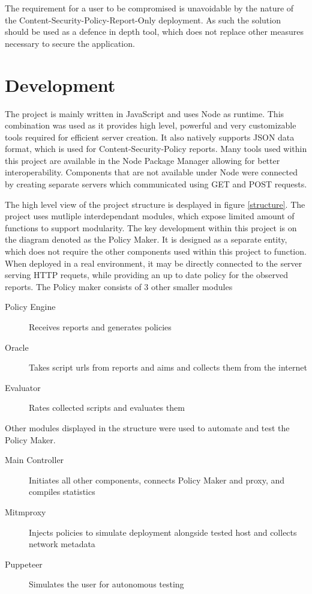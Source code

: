 The requirement for a user to be compromised is unavoidable by the nature of the Content-Security-Policy-Report-Only deployment.
As such the solution should be used as a defence in depth tool, which does not replace other measures necessary to secure the application.

\section{Development}

The project is mainly written in JavaScript and uses Node as runtime.
This combination was used as it provides high level, powerful and very customizable tools required for efficient server creation.
It also natively supports JSON data format, which is used for Content-Security-Policy reports.
Many tools used within this project are available in the Node Package Manager allowing for better interoperability.
Components that are not available under Node were connected by creating separate servers which communicated using GET and POST requests.

The high level view of the project structure is desplayed in figure \ref{structure}.
The project uses mutliple interdependant modules, which expose limited amount of functions to support modularity.
The key development within this project is on the diagram denoted as the Policy Maker.
It is designed as a separate entity, which does not require the other components used within this project to function.
When deployed in a real environment, it may be directly connected to the server serving HTTP requets, while providing an up to date policy for the observed reports.
The Policy maker consists of 3 other smaller modules 
\begin{description}
	\item[Policy Engine] Receives reports and generates policies
	\item[Oracle] Takes script urls from reports and aims and collects them from the internet
	\item[Evaluator] Rates collected scripts and evaluates them
\end{description}

Other modules displayed in the structure were used to automate and test the Policy Maker.
\begin{description}
	\item[Main Controller] Initiates all other components, connects Policy Maker and proxy, and compiles statistics
	\item[Mitmproxy] Injects policies to simulate deployment alongside tested host and collects network metadata
	\item[Puppeteer] Simulates the user for autonomous testing
\end{description}

